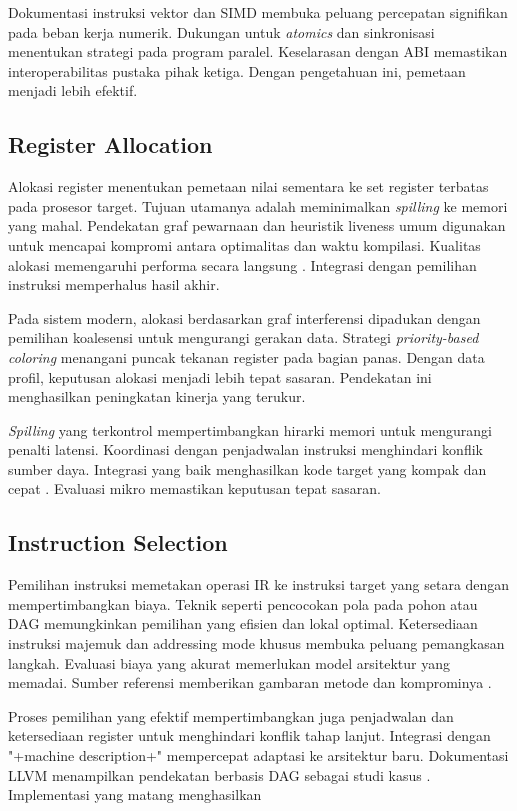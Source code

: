 \documentclass[../main.tex]{subfiles}
\begin{document}
Dokumentasi instruksi vektor dan SIMD membuka peluang percepatan signifikan pada beban kerja numerik. Dukungan untuk \emph{atomics} dan sinkronisasi menentukan strategi pada program paralel. Keselarasan dengan ABI memastikan interoperabilitas pustaka pihak ketiga. Dengan pengetahuan ini, pemetaan menjadi lebih efektif.

\subsection{Register Allocation}
Alokasi register menentukan pemetaan nilai sementara ke set register terbatas pada prosesor target. Tujuan utamanya adalah meminimalkan \emph{spilling} ke memori yang mahal. Pendekatan graf pewarnaan dan heuristik liveness umum digunakan untuk mencapai kompromi antara optimalitas dan waktu kompilasi. Kualitas alokasi memengaruhi performa secara langsung \citep{WikiRegisterAllocation}. Integrasi dengan pemilihan instruksi memperhalus hasil akhir.

Pada sistem modern, alokasi berdasarkan graf interferensi dipadukan dengan pemilihan koalesensi untuk mengurangi gerakan data. Strategi \emph{priority-based coloring} menangani puncak tekanan register pada bagian panas. Dengan data profil, keputusan alokasi menjadi lebih tepat sasaran. Pendekatan ini menghasilkan peningkatan kinerja yang terukur.

\emph{Spilling} yang terkontrol mempertimbangkan hirarki memori untuk mengurangi penalti latensi. Koordinasi dengan penjadwalan instruksi menghindari konflik sumber daya. Integrasi yang baik menghasilkan kode target yang kompak dan cepat \citep{WikiRegisterAllocation}. Evaluasi mikro memastikan keputusan tepat sasaran.

\subsection{Instruction Selection}
Pemilihan instruksi memetakan operasi IR ke instruksi target yang setara dengan mempertimbangkan biaya. Teknik seperti pencocokan pola pada pohon atau DAG memungkinkan pemilihan yang efisien dan lokal optimal. Ketersediaan instruksi majemuk dan addressing mode khusus membuka peluang pemangkasan langkah. Evaluasi biaya yang akurat memerlukan model arsitektur yang memadai. Sumber referensi memberikan gambaran metode dan komprominya \citep{WikiInstructionSelection}.

Proses pemilihan yang efektif mempertimbangkan juga penjadwalan dan ketersediaan register untuk menghindari konflik tahap lanjut. Integrasi dengan "+machine description+" mempercepat adaptasi ke arsitektur baru. Dokumentasi LLVM menampilkan pendekatan berbasis DAG sebagai studi kasus \citep{LLVMOverview}. Implementasi yang matang menghasilkan 
\end{document}
